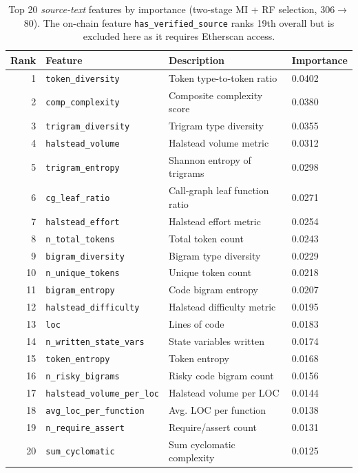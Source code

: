 \begin{table}[t]
\centering
\caption{Top 20 \emph{source-text} features by importance (two-stage MI + RF selection, 306$\rightarrow$80). The on-chain feature \texttt{has\_verified\_source} ranks 19th overall but is excluded here as it requires Etherscan access.}
\label{tab:features}
\begin{tabular}{rlll}
\hline
\textbf{Rank} & \textbf{Feature} & \textbf{Description} & \textbf{Importance} \\
\hline
1 & \texttt{token\_diversity} & Token type-to-token ratio & 0.0402 \\
2 & \texttt{comp\_complexity} & Composite complexity score & 0.0380 \\
3 & \texttt{trigram\_diversity} & Trigram type diversity & 0.0355 \\
4 & \texttt{halstead\_volume} & Halstead volume metric & 0.0312 \\
5 & \texttt{trigram\_entropy} & Shannon entropy of trigrams & 0.0298 \\
6 & \texttt{cg\_leaf\_ratio} & Call-graph leaf function ratio & 0.0271 \\
7 & \texttt{halstead\_effort} & Halstead effort metric & 0.0254 \\
8 & \texttt{n\_total\_tokens} & Total token count & 0.0243 \\
9 & \texttt{bigram\_diversity} & Bigram type diversity & 0.0229 \\
10 & \texttt{n\_unique\_tokens} & Unique token count & 0.0218 \\
11 & \texttt{bigram\_entropy} & Code bigram entropy & 0.0207 \\
12 & \texttt{halstead\_difficulty} & Halstead difficulty metric & 0.0195 \\
13 & \texttt{loc} & Lines of code & 0.0183 \\
14 & \texttt{n\_written\_state\_vars} & State variables written & 0.0174 \\
15 & \texttt{token\_entropy} & Token entropy & 0.0168 \\
16 & \texttt{n\_risky\_bigrams} & Risky code bigram count & 0.0156 \\
17 & \texttt{halstead\_volume\_per\_loc} & Halstead volume per LOC & 0.0144 \\
18 & \texttt{avg\_loc\_per\_function} & Avg. LOC per function & 0.0138 \\
19 & \texttt{n\_require\_assert} & Require/assert count & 0.0131 \\
20 & \texttt{sum\_cyclomatic} & Sum cyclomatic complexity & 0.0125 \\
\hline
\end{tabular}
\end{table}